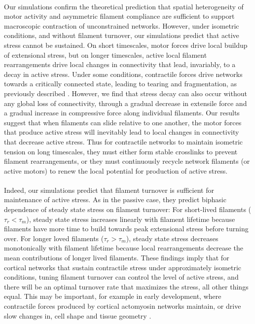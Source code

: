 \paragraph{} Our simulations confirm the theoretical prediction \cite{1367-2630-14-3-033037,rheo_2D1,rheo_active} that spatial heterogeneity of motor activity and asymmetric filament compliance are sufficient to support macroscopic contraction of unconstrained networks. However, under isometric conditions, and without filament turnover, our simulations predict that active stress cannot be sustained. On short timescales, motor forces drive local buildup of extensional stress, but on longer timescales, active local filament rearrangements drive local changes in connectivity that lead, invariably, to a decay in active stress.  Under some conditions, contractile forces drive networks towards a critically connected state, leading to tearing and fragmentation, as previously described \cite{Alvarado:2013aa, Mak:2016aa}. However, we find that stress decay can also occur without any global loss of connectivity, through a gradual decrease in extensile force and a gradual increase in compressive force along individual filaments.   Our results suggest that when filaments can slide relative to one another, the motor forces that produce active stress will inevitably lead to local changes in connectivity that decrease active stress.  Thus for contractile networks to maintain isometric tension on long timescales, they must either form stable crosslinks to prevent filament rearrangements, or they must continuously recycle network filaments (or active motors) to renew the local potential for production of active stress.

\paragraph{} Indeed, our simulations predict that filament turnover is sufficient for maintenance of active stress. As in the passive case, they predict biphasic dependence of steady state stress on filament turnover: For short-lived filaments ($\tau_r < \tau_m$), steady state stress increases linearly with filament lifetime because filaments have more time to build towards peak extensional stress before turning over.  For longer loved filaments ($\tau_r > \tau_m$), steady state stress decreases monotonically with filament lifetime because local rearrangements decrease the mean contributions of longer lived filaments. These findings imply that for cortical networks that sustain contractile stress under approximately isometric conditions, tuning filament turnover can control the level of active stress, and there will be an optimal turnover rate that maximizes the stress, all other things equal.  This may be important, for example in early development, where contractile forces produced by cortical actomyosin networks maintain, or drive slow changes in, cell shape and tissue geometry \cite{Salbreux2012536,Gorfinkiel2011531}.


